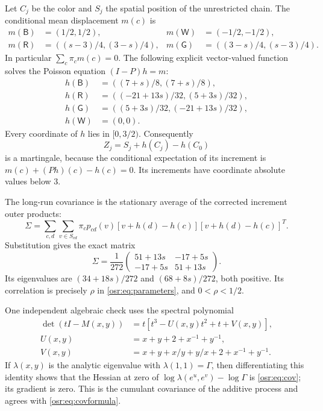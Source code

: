 \documentclass[11pt,letterpaper]{article}
\newcommand{\G}{\Gamma}\newcommand{\s}{\sqrt{17}}
\newcommand{\B}{\mathsf B}\newcommand{\RR}{\mathsf R}\newcommand{\GG}{\mathsf G}\newcommand{\W}{\mathsf W}
\numberwithin{equation}{section}
\begin{document}
Let $C_j$ be the color and $S_j$ the spatial position of the unrestricted chain. The conditional mean displacement $m(c)$ is
\begin{align*}
 m(\B)&=(1/2,1/2),&m(\W)&=(-1/2,-1/2),\\
 m(\RR)&=((s-3)/4,(3-s)/4),&
 m(\GG)&=((3-s)/4,(s-3)/4).
\end{align*}
In particular $\sum_c\pi_c m(c)=0$. The following explicit vector-valued function solves the Poisson equation $(I-P)h=m$:
\begin{align}
 h(\B)&=((7+s)/8,(7+s)/8),\nonumber\\
 h(\RR)&=((-21+13s)/32,(5+3s)/32),\label{osr:eq:h}\\
 h(\GG)&=((5+3s)/32,(-21+13s)/32),\nonumber\\
 h(\W)&=(0,0).\nonumber
\end{align}
Every coordinate of $h$ lies in $[0,3/2)$. Consequently
\begin{equation}\label{osr:eq:martingale}
 Z_j=S_j+h(C_j)-h(C_0)
\end{equation}
is a martingale, because the conditional expectation of its increment is $m(c)+(Ph)(c)-h(c)=0$. Its increments have coordinate absolute values below $3$.

The long-run covariance is the stationary average of the corrected increment outer products:
\begin{equation}\label{osr:eq:covformula}
 \Sigma=\sum_{c,d}\sum_{v\in S_{cd}}\pi_c p_{cd}(v)
       [v+h(d)-h(c)][v+h(d)-h(c)]^T.
\end{equation}
Substitution gives the exact matrix
\begin{equation}\label{osr:eq:cov}
 \Sigma=\frac1{272}\begin{pmatrix}51+13s&-17+5s\\-17+5s&51+13s\end{pmatrix}.
\end{equation}
Its eigenvalues are $(34+18s)/272$ and $(68+8s)/272$, both positive. Its correlation is precisely $\rho$ in \eqref{osr:eq:parameters}, and $0<\rho<1/2$.

One independent algebraic check uses the spectral polynomial
\begin{align}
 \det(tI-M(x,y))&=t[t^3-U(x,y)t^2+t+V(x,y)],\label{osr:eq:cubic}\\
 U(x,y)&=x+y+2+x^{-1}+y^{-1},\nonumber\\
 V(x,y)&=x+y+x/y+y/x+2+x^{-1}+y^{-1}.\nonumber
\end{align}
If $\lambda(x,y)$ is the analytic eigenvalue with $\lambda(1,1)=\G$, then differentiating this identity shows that the Hessian at zero of $\log\lambda(e^u,e^v)-\log\G$ is \eqref{osr:eq:cov}; its gradient is zero. This is the cumulant covariance of the additive process and agrees with \eqref{osr:eq:covformula}.
\end{document}

